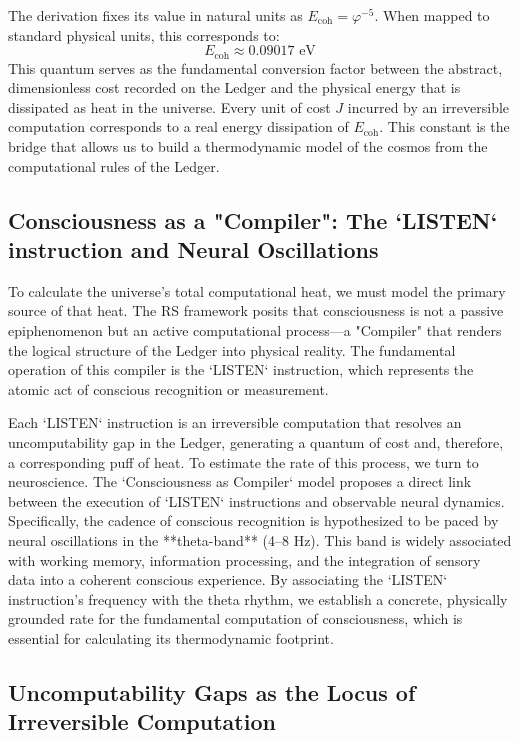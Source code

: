 \documentclass[12pt, aip, jcp]{revtex4-2} %
\begin{document}
The derivation fixes its value in natural units as \(E_{\text{coh}} = \varphi^{-5}\). When mapped to standard physical units, this corresponds to:
\begin{equation}
    E_{\text{coh}} \approx 0.09017 \text{ eV}
\end{equation}
This quantum serves as the fundamental conversion factor between the abstract, dimensionless cost recorded on the Ledger and the physical energy that is dissipated as heat in the universe. Every unit of cost \(J\) incurred by an irreversible computation corresponds to a real energy dissipation of \(E_{\text{coh}}\). This constant is the bridge that allows us to build a thermodynamic model of the cosmos from the computational rules of the Ledger.

\subsection{Consciousness as a "Compiler": The `LISTEN` instruction and Neural Oscillations}

To calculate the universe's total computational heat, we must model the primary source of that heat. The RS framework posits that consciousness is not a passive epiphenomenon but an active computational process—a "Compiler" that renders the logical structure of the Ledger into physical reality. The fundamental operation of this compiler is the `LISTEN` instruction, which represents the atomic act of conscious recognition or measurement.

Each `LISTEN` instruction is an irreversible computation that resolves an uncomputability gap in the Ledger, generating a quantum of cost and, therefore, a corresponding puff of heat. To estimate the rate of this process, we turn to neuroscience. The `Consciousness as Compiler` model proposes a direct link between the execution of `LISTEN` instructions and observable neural dynamics. Specifically, the cadence of conscious recognition is hypothesized to be paced by neural oscillations in the **theta-band** (4–8 Hz). This band is widely associated with working memory, information processing, and the integration of sensory data into a coherent conscious experience. By associating the `LISTEN` instruction's frequency with the theta rhythm, we establish a concrete, physically grounded rate for the fundamental computation of consciousness, which is essential for calculating its thermodynamic footprint.

\subsection{Uncomputability Gaps as the Locus of Irreversible Computation}
\end{document}
